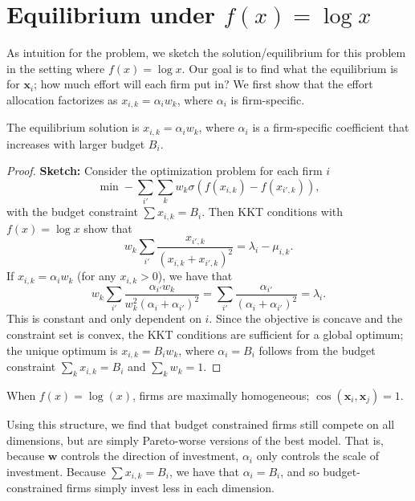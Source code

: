 \documentclass[msom,blindrev]{informs3_ExtAbst}
\begin{document}
\section{Equilibrium under $f(x)=\log x$}
As intuition for the problem, we sketch the solution/equilibrium for this problem in the setting where $f(x) = \log x$. 
Our goal is to find what the equilibrium is for $\mathbf{x}_{i}$; how much effort will each firm put in? 
We first show that the effort allocation factorizes as $x_{i,k} = \alpha_{i} w_{k}$, where $\alpha_{i}$ is firm-specific. 
\begin{lemma} 
The equilibrium solution is $x_{i,k} = \alpha_{i} w_{k}$, where $\alpha_{i}$ is a firm-specific coefficient that increases with larger budget $B_{i}$. 
\end{lemma}
\begin{proof}
    \textbf{Sketch:} 
    Consider the optimization problem for each firm $i$
    \[
    \min -\sum_{i'} \sum_{k} w_{k} \sigma(f(x_{i,k})-f(x_{i',k})),
    \]
    with the budget constraint $\sum x_{i,k} = B_{i}$. 
    Then KKT conditions with $f(x) = \log x$ show that 
    \[
    w_{k} \sum_{i'} \frac{x_{i',k}}{(x_{i,k} + x_{i',k})^2}  = \lambda_{i}-\mu_{i,k}.
    \]
    If $x_{i,k} = \alpha_{i} w_{k}$ (for any $x_{i,k} > 0$), we have that
    \[
    w_{k} \sum_{i'} \frac{\alpha_{i'} w_{k}}{w_{k}^2 (\alpha_{i}+\alpha_{i'})^2} = \sum_{i'} \frac{\alpha_{i'}}{(\alpha_{i}+\alpha_{i'})^2} = \lambda_{i}. 
    \]
    This is constant and only dependent on $i$.
    Since the objective is concave and the constraint set is convex, the KKT conditions are sufficient for a global optimum; the unique optimum is $x_{i,k} = B_{i} w_{k}$, where $\alpha_i = B_i$ follows from the budget constraint $\sum_k x_{i,k} = B_i$ and $\sum_k w_k = 1$.
\end{proof}
\begin{corollary}
    When $f(x) = \log(x)$, firms are maximally homogeneous; $\cos(\mathbf{x}_{i},\mathbf{x}_{j}) = 1$. 
\end{corollary}

Using this structure, we find that budget constrained firms still compete on all dimensions, but are simply Pareto-worse versions of the best model. 
That is, because $\mathbf{w}$ controls the direction of investment, $\alpha_{i}$ only controls the scale of investment. 
Because $\sum x_{i,k} = B_{i}$, we have that $\alpha_{i} = B_{i}$, and so budget-constrained firms simply invest less in each dimension. 
\end{document}
